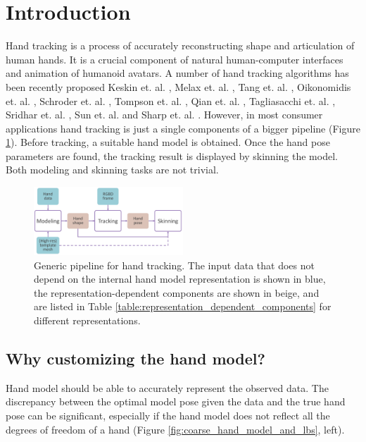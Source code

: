 \section{Introduction}

Hand tracking is a process of accurately reconstructing shape and articulation of human hands. It is a crucial component of natural human-computer interfaces and animation of humanoid avatars. A number of hand tracking algorithms has been recently proposed  Keskin et. al. \cite{keskin2012hand}, Melax et. al. \cite{melax2013dynamics}, Tang et. al. \cite{tang2013real}, Oikonomidis et. al. \cite{oikonomidis2014evolutionary}, Schroder et. al. \cite{schroder2014real},
Tompson et. al. \cite{tompson2014real}, Qian et. al. \cite{qian2014realtime},  Tagliasacchi et. al. \cite{tagliasacchi2015robust}, Sridhar et. al. \cite{sridhar2015fast}, Sun et. al. \cite{sun2015cascaded} and Sharp et. al. \cite{sharp2015accurate}.
However, in most consumer applications hand tracking is just a single components of a bigger pipeline (Figure \ref{fig:generic_pipeline}). Before tracking, a suitable hand model is obtained. Once the hand pose parameters are found, the tracking result is displayed by skinning the model. Both modeling and skinning tasks are not trivial.

\begin{figure}[h!] 
	\centering
	\includegraphics[width=0.5\textwidth]{figures/generic_pipeline}
	\caption{Generic pipeline for hand tracking. The input data that does not depend on the internal hand model representation is shown in blue, the representation-dependent components are shown in beige, and are listed in Table \ref{table:representation_dependent_components} for different representations.}
	\label{fig:generic_pipeline}
\end{figure}


\subsection{Why customizing the hand model?}

Hand model should be able to accurately represent the observed data.  The discrepancy between the optimal model pose given the data and the true hand pose can be significant, especially if the hand model does not reflect all the degrees of freedom of a hand (Figure \ref{fig:coarse_hand_model_and_lbs}, left).


